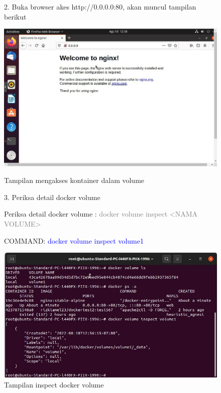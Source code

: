 \begin{figure}
    2. Buka browser akes http://0.0.0.0:80, akan muncul tampilan berikut 
    \begin{center}
        \includegraphics[width=\linewidth]{image/39.jpg}
        \caption{Tampilan mengakses kontainer dalam volume}
        \label{fig:my_figure}
    \end{center}

    3. Periksa detail docker volume
    
    Periksa detail docker volume : \textcolor{Gray}{docker volume inspect <NAMA VOLUME>}
    
    COMMAND: \textcolor{Blue}{docker volume inspect volume1}
    \begin{center}
        \includegraphics[width=\linewidth]{image/40.jpg}
        \caption{Tampilan inspect docker volume}
        \label{fig:my_figure}
    \end{center}
\end{figure}


